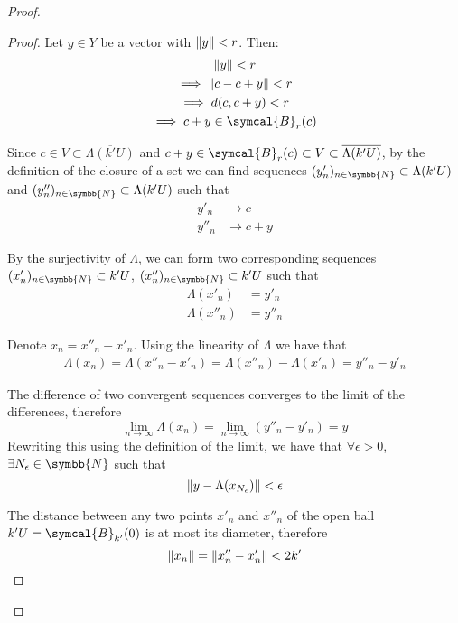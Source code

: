\documentclass[a4paper, 12pt]{article}
\theoremstyle{definition}
\newcommand{\naturals}{\symbb{N}}
\newcommand{\ball}{\symcal{B}}
\DeclarePairedDelimiter{\norm}{\lVert}{\rVert}
\begin{document}
\begin{proof}
\begin{proof}
Let \(y \in Y\) be a vector with \(\norm{y} < r\). Then:
\begin{gather*}
    \norm{y} < r \\
    \implies \norm{c - c + y} < r \\
    \implies d(c, c + y) < r \\
    \implies c + y \in \ball_r (c)
\end{gather*}

Since \(c \in V \subset \overline{\Lambda(k'U)}\) and \(c + y \in \ball_r (c) \subset V \subset \overline{\Lambda(k'U)}\), by the definition of the closure of a set we can find sequences \((y'_n)_{n \in \naturals} \subset \Lambda(k'U)\) and \((y''_n)_{n \in \naturals} \subset \Lambda(k'U)\) such that
\begin{align*}
    y'_n &\rightarrow c \\
    y''_n &\rightarrow c + y
\end{align*}

By the surjectivity of \(\Lambda\), we can form two corresponding sequences \((x'_n)_{n \in \naturals} \subset k'U\), \((x''_n)_{n \in \naturals} \subset k'U\) such that
\begin{align*}
    \Lambda(x'_n) &= y'_n \\
    \Lambda(x''_n) &= y''_n
\end{align*}

Denote \(x_n = x''_n - x'_n\). Using the linearity of \(\Lambda\) we have that
\begin{gather*}
    \Lambda(x_n) = \Lambda(x''_n - x'_n) = \Lambda(x''_n) - \Lambda(x'_n) = y''_n - y'_n
\end{gather*}

The difference of two convergent sequences converges to the limit of the differences, therefore
\[
    \lim_{n \to \infty} \Lambda(x_n) = \lim_{n \to \infty} \left(y''_n - y'_n\right) = y
\]
Rewriting this using the definition of the limit, we have that \(\forall \epsilon > 0\), \(\exists N_\epsilon \in \naturals\) such that
\begin{equation}  \label{norm_of_y_minus_lambda_xn}
    \norm{y - \Lambda(x_{N_\epsilon})} < \epsilon
\end{equation}

The distance between any two points \(x'_n\) and \(x''_n\) of the open ball \(k'U = \ball_{k'} (0)\) is at most its diameter, therefore
\begin{equation} \label{norm_of_xn}
    \norm{x_n} = \norm{x''_n - x'_n} < 2k'
\end{equation}


\end{proof}
\end{proof}
\end{document}
